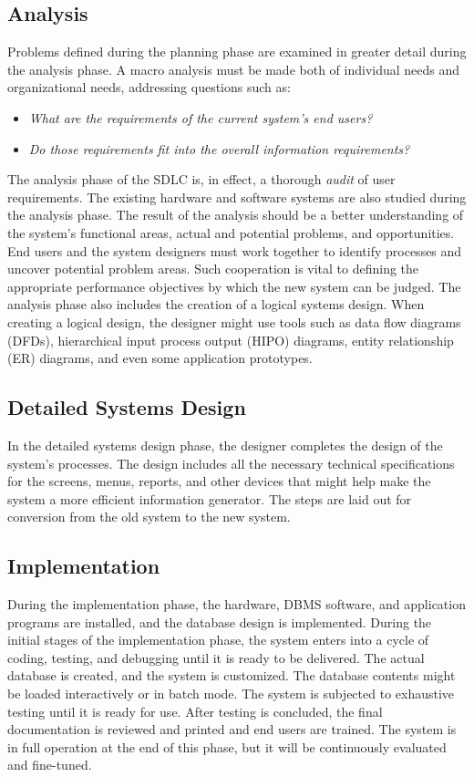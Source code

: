 \documentclass[a4paper, 12pt, titlepage]{report}
\begin{document}
\subsection{Analysis}
Problems defined during the planning phase are examined in greater detail during the analysis phase. A macro analysis must be made both of individual needs and organizational needs, addressing questions such as:
\begin{itemize}
\item \emph{What are the requirements of the current system’s end users?}
\item \emph{Do those requirements fit into the overall information requirements?}
\end{itemize}
The analysis phase of the SDLC is, in effect, a thorough \emph{audit} of user requirements. The existing hardware and software systems are also studied during the analysis phase. The result of the analysis should be a better understanding of the system’s functional areas, actual and potential problems, and opportunities. End users and the system designers must work together to identify processes and uncover potential problem areas. Such cooperation is vital to defining the appropriate performance objectives by which the new system can be judged. The analysis phase also includes the creation of a logical systems design. When creating a logical design, the designer might use tools such as data flow diagrams (DFDs), hierarchical input process output (HIPO) diagrams, entity relationship (ER) diagrams, and even some application prototypes.

\subsection{Detailed Systems Design}
In the detailed systems design phase, the designer completes the design of the system’s processes. The design includes all the necessary technical specifications for the screens, menus, reports, and other devices that might help make the system a more efficient information generator. The steps are laid out for conversion from the old system to the new system.

\subsection{Implementation}
During the implementation phase, the hardware, DBMS software, and application programs are installed, and the database design is implemented. During the initial stages of the implementation phase, the system enters into a cycle of coding, testing, and debugging until it is ready to be delivered. The actual database is created, and the system is customized. The database contents might be loaded interactively or in batch mode. The system is subjected to exhaustive testing until it is ready for use. After testing is concluded, the final documentation is reviewed and printed and end users are trained. The system is in full operation at the end of this phase, but it will be continuously evaluated and fine-tuned.
\end{document}
